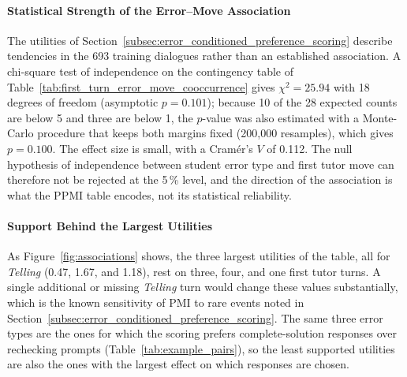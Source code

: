 
    \paragraph{Statistical Strength of the Error--Move Association}
    The utilities of Section~\ref{subsec:error_conditioned_preference_scoring} describe tendencies in the 693 training dialogues rather than an established association. A chi-square test of independence on the contingency table of Table~\ref{tab:first_turn_error_move_cooccurrence} gives \(\chi^{2} = 25.94\) with 18 degrees of freedom (asymptotic \(p = 0.101\)); because 10 of the 28 expected counts are below 5 and three are below 1, the \(p\)-value was also estimated with a Monte-Carlo procedure that keeps both margins fixed (200,000 resamples), which gives \(p = 0.100\). The effect size is small, with a Cram\'{e}r's \(V\) of 0.112. The null hypothesis of independence between student error type and first tutor move can therefore not be rejected at the 5\,\% level, and the direction of the association is what the PPMI table encodes, not its statistical reliability.

    \paragraph{Support Behind the Largest Utilities}
    As Figure~\ref{fig:associations} shows, the three largest utilities of the table, all for \textit{Telling} (0.47, 1.67, and 1.18), rest on three, four, and one first tutor turns. A single additional or missing \textit{Telling} turn would change these values substantially, which is the known sensitivity of PMI to rare events noted in Section~\ref{subsec:error_conditioned_preference_scoring}. The same three error types are the ones for which the scoring prefers complete-solution responses over rechecking prompts (Table~\ref{tab:example_pairs}), so the least supported utilities are also the ones with the largest effect on which responses are chosen.

